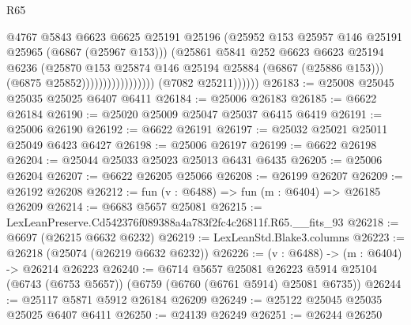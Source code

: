 \begin{lexlean}{R65}
\begin{coremodule}
{                                            @4767
                                            @5843
                                            @6623
                                            @6625
                                            @25191
                                            @25196
                                            (@25952
                                              @153
                                              @25957
                                              @146
                                              @25191
                                              @25965
                                              (@6867 (@25967 @153)))
                                            (@25861
                                              @5841
                                              @252
                                              @6623
                                              @6623
                                              @25194
                                              @6236
                                              (@25870
                                                @153
                                                @25874
                                                @146
                                                @25194
                                                @25884
                                                (@6867 (@25886 @153)))
                                              (@6875 @25852)))))))))))))))))
              (@7082 @25211))))))
@26183 := @25008 @25045 @25035 @25025 @6407 @6411
@26184 := @25006 @26183
@26185 := @6622 @26184
@26190 := @25020 @25009 @25047 @25037 @6415 @6419
@26191 := @25006 @26190
@26192 := @6622 @26191
@26197 := @25032 @25021 @25011 @25049 @6423 @6427
@26198 := @25006 @26197
@26199 := @6622 @26198
@26204 := @25044 @25033 @25023 @25013 @6431 @6435
@26205 := @25006 @26204
@26207 := @6622 @26205 @25066
@26208 := @26199 @26207
@26209 := @26192 @26208
@26212 := fun (v : @6488) => fun (m : @6404) => @26185 @26209
@26214 := @6683 @5657 @25081
@26215 := LexLeanPreserve.Cd542376f089388a4a783f2fc4c26811f.R65.__fits_93
@26218 := @6697 (@26215 @6632 @6232)
@26219 := LexLeanStd.Blake3.columns
@26223 := @26218 (@25074 (@26219 @6632 @6232))
@26226 := (v : @6488) -> (m : @6404) -> @26214 @26223
@26240 := @6714
    @5657
    @25081
    @26223
    @5914
    @25104
    (@6743 (@6753 @5657))
    (@6759 (@6760 (@6761 @5914) @25081 @6735))
@26244 := @25117 @5871 @5912 @26184 @26209
@26249 := @25122 @25045 @25035 @25025 @6407 @6411
@26250 := @24139 @26249
@26251 := @26244 @26250
}
\end{coremodule}
\end{lexlean}
